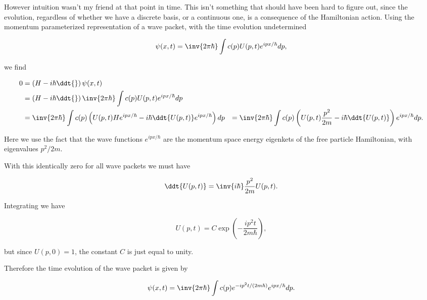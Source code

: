 However intuition wasn't my friend at that point in time.  This isn't something that should have been hard to figure out, since the evolution, regardless of whether we have a discrete basis, or a continuous one, is a consequence of the Hamiltonian action.  Using the momentum parameterized representation of a wave packet, with the time evolution undetermined

\begin{equation}\label{eqn:qmTwoExamReflection:n}
\psi(x, t) = \inv{2 \pi \hbar} \int c(p) U(p, t) e^{i p x/\hbar} dp,
\end{equation}

we find

\begin{align*}
0 &= 
\left(H - i \hbar \ddt{}\right) 
\psi(x, t) \\
&=
\left(H - i \hbar \ddt{}\right) 
\inv{2 \pi \hbar} \int c(p) U(p, t) e^{i p x/\hbar} dp \\
&=
\inv{2 \pi \hbar} \int c(p) \left( 
U(p, t) H e^{i p x/\hbar} 
-i \hbar \ddt{U(p, t)} e^{i p x/\hbar} 
\right) dp 
&=
\inv{2 \pi \hbar} \int c(p) \left( 
U(p, t) \frac{p^2}{2m} 
-i \hbar \ddt{U(p, t)} 
\right) 
e^{i p x/\hbar} 
dp.
\end{align*}

Here we use the fact that the wave functions $e^{i p x/\hbar}$ are the momentum space energy eigenkets of the free particle Hamiltonian, with eigenvalues $p^2/2m$.

With this identically zero for all wave packets we must have

\begin{equation}\label{eqn:qmTwoExamReflection:n}
\ddt{U(p, t)} 
= 
\inv{i \hbar}
\frac{p^2}{2m} 
U(p, t).
\end{equation}

Integrating we have

\begin{equation}\label{eqn:qmTwoExamReflection:n}
U(p, t) = C \exp\left( -\frac{i p^2 t}{2m \hbar} \right),
\end{equation}

but since $U(p, 0) = 1$, the constant $C$ is just equal to unity.

Therefore the time evolution of the wave packet is given by

\begin{equation}\label{eqn:qmTwoExamReflection:n}
\psi(x, t) = \inv{2 \pi \hbar} \int c(p) e^{-i p^2 t/(2m \hbar)} e^{i p x/\hbar} dp.
\end{equation}

